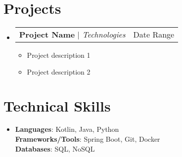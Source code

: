 \documentclass[letterpaper,11pt]{article}
\makeatletter
\newcommand{\resumeItem}[1]{
\item\small{
{#1 \vspace{-2pt}}
}
}
\newcommand{\resumeProjectHeading}[2]{
\item
\begin{tabular*}{0.97\textwidth}{l@{\extracolsep{\fill}}r}
\small#1 & #2 \\
\end{tabular*}\vspace{-7pt}
}
\newcommand{\resumeSubHeadingListStart}{\begin{itemize}[leftmargin=0.15in, label={}]}
\newcommand{\resumeSubHeadingListEnd}{\end{itemize}}
\newcommand{\resumeItemListStart}{\begin{itemize}}
\newcommand{\resumeItemListEnd}{\end{itemize}\vspace{-5pt}}
\makeatother
\begin{document}
\section{Projects}
\resumeSubHeadingListStart
\resumeProjectHeading{\textbf{Project Name} $|$ \emph{Technologies}}{Date Range}
\resumeItemListStart
\resumeItem{Project description 1}
\resumeItem{Project description 2}
\resumeItemListEnd
\resumeSubHeadingListEnd

\section{Technical Skills} %
\begin{itemize}[leftmargin=0.15in, label={}]
\item{
\textbf{Languages}{: Kotlin, Java, Python} \\
\textbf{Frameworks/Tools}{: Spring Boot, Git, Docker} \\
\textbf{Databases}{: SQL, NoSQL}
} \\
\end{itemize}


\end{document}
